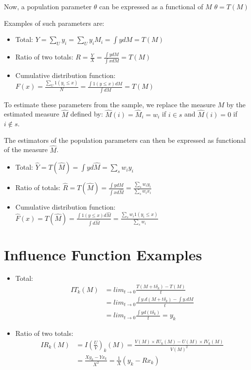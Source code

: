 \documentclass[]{book}
\begin{document}
Now, a population parameter \(\theta\) can be expressed as a functional of \(M\)
\(\theta=T(M)\)

Examples of such parameters are:

\begin{itemize}
\item
  Total:
  \(Y=\sum_Uy_i=\sum_U y_iM_i=\int ydM=T(M)\)
\item
  Ratio of two totals:
  \(R=\frac{Y}{X}=\frac{\int y dM}{\int x dM}=T(M)\)
\item
  Cumulative distribution function:
  \(F(x)=\frac{\sum_U 1(y_i\leq x)}{N}=\frac{\int 1(y\leq x)dM}{\int{dM}}=T(M)\)
\end{itemize}

To estimate these parameters from the sample, we replace the measure \(M\) by the estimated measure \(\hat{M}\) defined by: \(\hat{M}(i)=\hat{M}_i= w_i\) if \(i\in s\) and \(\hat{M}(i)=0\) if \(i\notin s\).

The estimators of the population parameters can then be expressed as functional of the measure \(\hat{M}\).

\begin{itemize}
\item
  Total:
  \(\hat{Y}=T(\hat{M})=\int yd\hat{M}=\sum_s w_iy_i\)
\item
  Ratio of totals:
  \(\hat{R}=T(\hat{M})=\frac{\int y d\hat{M}}{\int x d\hat{M}}=\frac{\sum_s w_iy_i}{\sum_s w_ix_i}\)
\item
  Cumulative distribution function:
  \(\hat{F}(x)=T(\hat{M})=\frac{\int 1(y\leq x)d\hat{M}}{\int{d\hat{M}}}=\frac{\sum_s w_i 1(y_i\leq x)}{\sum_s w_i}\)
\end{itemize}

\hypertarget{influence-function-examples}{%
\section{Influence Function Examples}\label{influence-function-examples}}

\begin{itemize}
\item
  Total:
  \[
  \begin{aligned}
  IT_k(M)&=lim_{t\rightarrow 0}\frac{T(M+t\delta_k)-T(M)}{t}\\
  &=lim_{t\rightarrow 0}\frac{\int y.d(M+t\delta_k)-\int y.dM}{t}\\
  &=lim_{t\rightarrow 0}\frac{\int yd(t\delta_k)}{t}=y_k  
  \end{aligned}
  \]
\item
  Ratio of two totals:
  \[
  \begin{aligned}
  IR_k(M)&=I\left(\frac{U}{V}\right)_k(M)=\frac{V(M)\times IU_k(M)-U(M)\times IV_k(M)}{V(M)^2}\\
  &=\frac{X y_k-Y x_k}{X^2}=\frac{1}{X}(y_k-Rx_k)
  \end{aligned}
  \]
\end{itemize}
\end{document}
